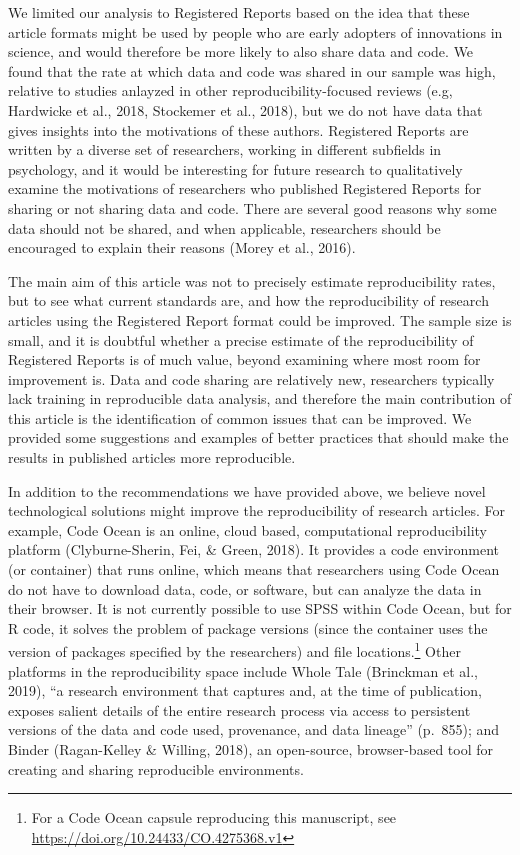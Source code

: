 \documentclass[,jou, a4paper,floatsintext]{apa6}
\let\rmarkdownfootnote\footnote%
\def\footnote{\protect\rmarkdownfootnote}
\begin{document}
We limited our analysis to Registered Reports based on the idea that these article formats might be used by people who are early adopters of innovations in science, and would therefore be more likely to also share data and code. We found that the rate at which data and code was shared in our sample was high, relative to studies anlayzed in other reproducibility-focused reviews (e.g, Hardwicke et al., 2018, Stockemer et al., 2018), but we do not have data that gives insights into the motivations of these authors. Registered Reports are written by a diverse set of researchers, working in different subfields in psychology, and it would be interesting for future research to qualitatively examine the motivations of researchers who published Registered Reports for sharing or not sharing data and code. There are several good reasons why some data should not be shared, and when applicable, researchers should be encouraged to explain their reasons (Morey et al., 2016).

The main aim of this article was not to precisely estimate reproducibility rates, but to see what current standards are, and how the reproducibility of research articles using the Registered Report format could be improved. The sample size is small, and it is doubtful whether a precise estimate of the reproducibility of Registered Reports is of much value, beyond examining where most room for improvement is. Data and code sharing are relatively new, researchers typically lack training in reproducible data analysis, and therefore the main contribution of this article is the identification of common issues that can be improved. We provided some suggestions and examples of better practices that should make the results in published articles more reproducible.

In addition to the recommendations we have provided above, we believe novel technological solutions might improve the reproducibility of research articles. For example, Code Ocean is an online, cloud based, computational reproducibility platform (Clyburne-Sherin, Fei, \& Green, 2018). It provides a code environment (or container) that runs online, which means that researchers using Code Ocean do not have to download data, code, or software, but can analyze the data in their browser. It is not currently possible to use SPSS within Code Ocean, but for R code, it solves the problem of package versions (since the container uses the version of packages specified by the researchers) and file locations.\footnote{For a Code Ocean capsule reproducing this manuscript, see \url{https://doi.org/10.24433/CO.4275368.v1}} Other platforms in the reproducibility space include Whole Tale (Brinckman et al., 2019), \enquote{a research environment that captures and, at the time of publication, exposes salient details of the entire research process via access to persistent versions of the data and code used, provenance, and data lineage} (p.~855); and Binder (Ragan-Kelley \& Willing, 2018), an open-source, browser-based tool for creating and sharing reproducible environments.
\end{document}
